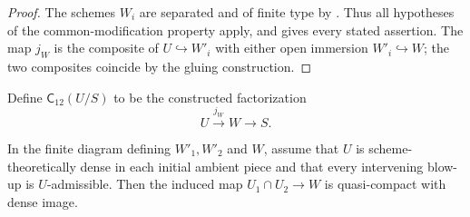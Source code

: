 \begin{proof}
  The schemes $W_i$ are separated and of finite type by
  .  Thus all hypotheses of the
  common-modification property apply, and
   gives every stated assertion.
  The map $j_W$ is the composite of $U\hookrightarrow W'_i$ with either open
  immersion $W'_i\hookrightarrow W$; the two composites coincide by the
  gluing construction.
\end{proof}

\begin{definition}
  \label{def:nagata-two-open-compactification-candidate}

  Define $\mathsf C_{12}(U/S)$ to be the constructed factorization
  \[
    U\xrightarrow{j_W}W\longrightarrow S.
  \]
\end{definition}

\begin{lemma}
  \label{lemma:nagata-two-open-density-transport}

  In the finite diagram defining $W'_1,W'_2$ and $W$, assume that $U$ is
  scheme-theoretically dense in each initial ambient piece and that every
  intervening blow-up is $U$-admissible.  Then the induced map
  $U_1\cap U_2\to W$ is quasi-compact with dense image.
\end{lemma}

